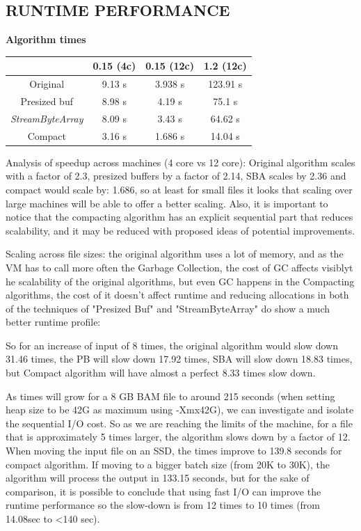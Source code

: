 \documentclass[a4paper,twoside]{article}
\begin{document}
\subsection{\uppercase{Runtime performance}}
\begin{small}
\par
\textbf{Algorithm times} \\
\vspace{-0.4cm}
\begin{center}
\begin{tabular}{|c|c|c|c|}
\hline
						& 0.15 (4c)		    & 0.15 (12c)		& 1.2 (12c) 			\\ \hline
Original				& 9.13 s			& 3.938 s			& 123.91 s			\\ \hline
Presized buf   			& 8.98 s			& 4.19 s			& 75.1 s	\\ \hline
{\it StreamByteArray}	& 8.09 s			& 3.43 s			& 64.62 s			\\ \hline
Compact 				& 3.16 s			& 1.686 s			& 14.04 s	\\ \hline
\end{tabular}
\end{center}
\end{small}

Analysis of speedup across machines (4 core vs 12 core):
Original algorithm scales with a factor of 2.3, presized buffers by a factor of 2.14, SBA scales by 2.36
and compact would scale by: 1.686, so at least for small files it looks that scaling over large machines will be able to offer a better scaling. Also, it is important to notice that the compacting algorithm has an explicit sequential part that reduces scalability, and it may be reduced with proposed ideas 
of potential improvements.

Scaling across file sizes: the original algorithm uses a lot of memory, and as the VM has to call more often the Garbage Collection, the cost of GC affects visiblyt he scalability of the original algorithms, but even GC happens in the Compacting algorithms, the cost of it doesn't affect runtime and reducing allocations in both of the techniques of "Presized Buf" and "StreamByteArray" do show a much better runtime profile:

So for an increase of input of 8 times, the original algorithm would slow down 31.46 times, the PB will slow down 17.92 times, SBA will slow down 18.83 times, but Compact algorithm will have almost a perfect 8.33 times slow down.

As times will grow for a 8 GB BAM file to around 215 seconds (when setting heap size to be 42G as maximum using -Xmx42G), we can investigate and isolate the sequential I/O cost. So as we are reaching the limits of the machine, for a file that is approximately 5 times larger, the algorithm slows down by a factor of 12. When moving the input file on an SSD, the times improve to 139.8 seconds for compact algorithm. If moving to a bigger batch size (from 20K to 30K), the algorithm will process the output in 133.15 seconds, but for the sake of comparison, it is possible to conclude that using fast I/O can improve the runtime performance so the slow-down is from 12 times to 10 times (from 14.08sec to <140 sec).
\end{document}

